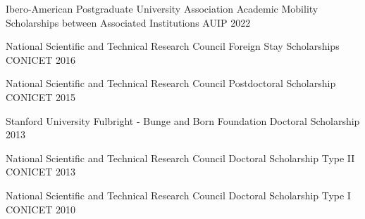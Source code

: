 

\begin{cventries}

  \cventry
    {Ibero-American Postgraduate University Association} %
    {Academic Mobility Scholarships between Associated Institutions} %
    {AUIP} %
    {2022} %
    {}

  \cventry
    {National Scientific and Technical Research Council}
    {Foreign Stay Scholarships}
    {CONICET}
    {2016}
    {}

  \cventry
    {National Scientific and Technical Research Council}
    {Postdoctoral Scholarship}
    {CONICET}
    {2015}
    {}


  \cventry
    {Stanford University}
    {Fulbright - Bunge and Born Foundation}
    {Doctoral Scholarship}
    {2013}
    {}

  \cventry
    {National Scientific and Technical Research Council}
    {Doctoral Scholarship Type II}
    {CONICET}
    {2013}
    {}
    
  \cventry
    {National Scientific and Technical Research Council}
    {Doctoral Scholarship Type I}
    {CONICET}
    {2010}
    {}
\end{cventries}

